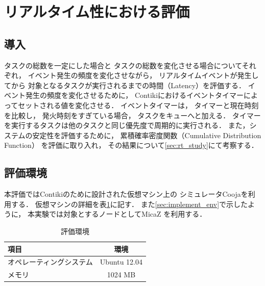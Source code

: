 \section{リアルタイム性における評価}
\subsection{導入}
タスクの総数を一定にした場合と
タスクの総数を変化させる場合についてそれぞれ，
イベント発生の頻度を変化させながら，
リアルタイムイベントが発生してから
対象となるタスクが実行されるまでの時間（Latency）を評価する．
イベント発生の頻度を変化させるために，
Contikiにおけるイベントタイマーによってセットされる値を変化させる．
イベントタイマーは，
タイマーと現在時刻を比較し，
発火時刻をすぎている場合，
タスクをキューへと加える．
タイマーを実行するタスクは他のタスクと同じ優先度で周期的に実行される．
また，システムの安定性を評価するために，
累積確率密度関数（Cumulative Distribution Function）
を評価に取り入れ，
その結果について\ref{sec:rt_study}にて考察する．



\subsection{評価環境}
本評価ではContikiのために設計された仮想マシン上の
シミュレータCooja\cite{osterlind2006cross}を利用する．
仮想マシンの詳細を表\ref{tab:instant_contiki}に記す．
また\ref{sec:implement_env}で示したように，
本実験では対象とするノードとしてMicaZ\cite{Hill:2002:MWP:623308.624560}
を利用する．

\begin{table}[htbp]
  \centering
  \caption{評価環境}
  \begin{tabular}{|l||c|} \hline
  	項目	 & 環境 \\ \hline \hline
	オペレーティングシステム & Ubuntu 12.04 \\ \hline
	メモリ & 1024 MB \\ \hline
  \end{tabular}
  \label{tab:instant_contiki}
\end{table}






